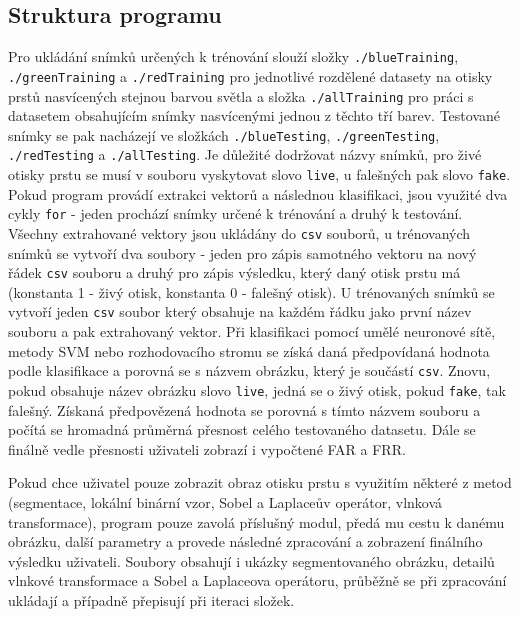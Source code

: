 \subsection{Struktura programu}
Pro ukládání snímků určených k trénování slouží složky \verb=./blueTraining=, \verb=./greenTraining= a \verb=./redTraining= pro jednotlivé rozdělené datasety na otisky prstů nasvícených stejnou barvou světla a složka \verb=./allTraining= pro práci s datasetem obsahujícím snímky nasvícenými jednou z těchto tří barev. Testované snímky se pak nacházejí ve složkách \verb=./blueTesting=, \verb=./greenTesting=, \verb=./redTesting= a \verb=./allTesting=. Je důležité dodržovat názvy snímků, pro živé otisky prstu se musí v souboru vyskytovat slovo \verb=live=, u falešných pak slovo \verb=fake=. Pokud program provádí extrakci vektorů a následnou klasifikaci, jsou využité dva cykly \verb=for= - jeden prochází snímky určené k trénování a druhý k testování. Všechny extrahované vektory jsou ukládány do \verb=csv= souborů, u trénovaných snímků se vytvoří dva soubory - jeden pro zápis samotného vektoru na nový řádek \verb=csv= souboru a druhý pro zápis výsledku, který daný otisk prstu má (konstanta 1 - živý otisk, konstanta 0 - falešný otisk). U trénovaných snímků se vytvoří jeden \verb=csv= soubor který obsahuje na každém řádku jako první název souboru a pak extrahovaný vektor. Při klasifikaci pomocí umělé neuronové sítě, metody SVM nebo rozhodovacího stromu se získá daná předpovídaná hodnota podle klasifikace a porovná se s názvem obrázku, který je součástí \verb=csv=. Znovu, pokud obsahuje název obrázku slovo \verb=live=, jedná se o živý otisk, pokud \verb=fake=, tak falešný. Získaná předpovězená hodnota se porovná s tímto názvem souboru a počítá se hromadná průměrná přesnost celého testovaného datasetu. Dále se finálně vedle přesnosti uživateli zobrazí i vypočtené FAR a FRR. 

Pokud chce uživatel pouze zobrazit obraz otisku prstu s využitím některé z metod (segmentace, lokální binární vzor, Sobel a Laplaceův operátor, vlnková transformace), program pouze zavolá příslušný modul, předá mu cestu k danému obrázku, další parametry a provede následné zpracování a zobrazení finálního výsledku uživateli. Soubory obsahují i ukázky segmentovaného obrázku, detailů vlnkové transformace a Sobel a Laplaceova operátoru, průběžně se při zpracování ukládají a případně přepisují při iteraci složek.






